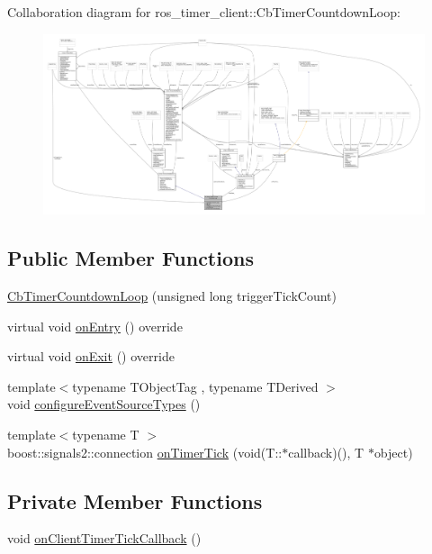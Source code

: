 Collaboration diagram for ros\+\_\+timer\+\_\+client\+:\+:Cb\+Timer\+Countdown\+Loop\+:\nopagebreak
\begin{figure}[H]
\begin{center}
\leavevmode
\includegraphics[width=350pt]{classros__timer__client_1_1CbTimerCountdownLoop__coll__graph}
\end{center}
\end{figure}
\subsection*{Public Member Functions}
\begin{DoxyCompactItemize}
\item 
\hyperlink{classros__timer__client_1_1CbTimerCountdownLoop_aadceff62d42bac73682da8d729fe9c36}{Cb\+Timer\+Countdown\+Loop} (unsigned long trigger\+Tick\+Count)
\item 
virtual void \hyperlink{classros__timer__client_1_1CbTimerCountdownLoop_ae547ef69c9ce8029b0f5f27120155c9f}{on\+Entry} () override
\item 
virtual void \hyperlink{classros__timer__client_1_1CbTimerCountdownLoop_aa671fabe23945e85e65cee7a3c1e761b}{on\+Exit} () override
\item 
{\footnotesize template$<$typename T\+Object\+Tag , typename T\+Derived $>$ }\\void \hyperlink{classros__timer__client_1_1CbTimerCountdownLoop_a8e0193f4b75805b2b15fe6e63c631670}{configure\+Event\+Source\+Types} ()
\item 
{\footnotesize template$<$typename T $>$ }\\boost\+::signals2\+::connection \hyperlink{classros__timer__client_1_1CbTimerCountdownLoop_a7ebf87093607e9497f18eb0ded9fc1f9}{on\+Timer\+Tick} (void(T\+::$\ast$callback)(), T $\ast$object)
\end{DoxyCompactItemize}
\subsection*{Private Member Functions}
\begin{DoxyCompactItemize}
\item 
void \hyperlink{classros__timer__client_1_1CbTimerCountdownLoop_a8b3cbf593a9d3823cd1f56611fb0a0b3}{on\+Client\+Timer\+Tick\+Callback} ()
\end{DoxyCompactItemize}
